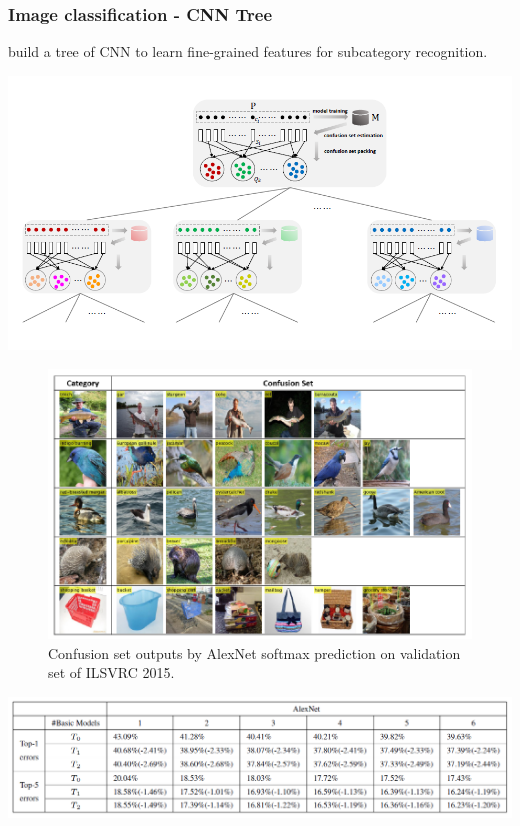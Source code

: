 \begin{frame}[allowframebreaks]
\frametitle{Image classification - CNN Tree}

\cite{wang2018learning} build a tree of CNN to learn fine-grained features for subcategory recognition.

\begin{center}
	\includegraphics[scale=0.8]{figs/CNNTree_scheme.png}
\end{center}

\framebreak

\begin{figure}
\begin{center}
	\includegraphics[scale=0.8]{figs/CNNTree_confusion_matrix_softmax}
\end{center}
\caption{Confusion set outputs by AlexNet softmax prediction on validation set of ILSVRC 2015.}
\end{figure}




\framebreak


\begin{center}
	\includegraphics[scale=0.7]{figs/CNNTree_result1.PNG}
\end{center}



\end{frame}
